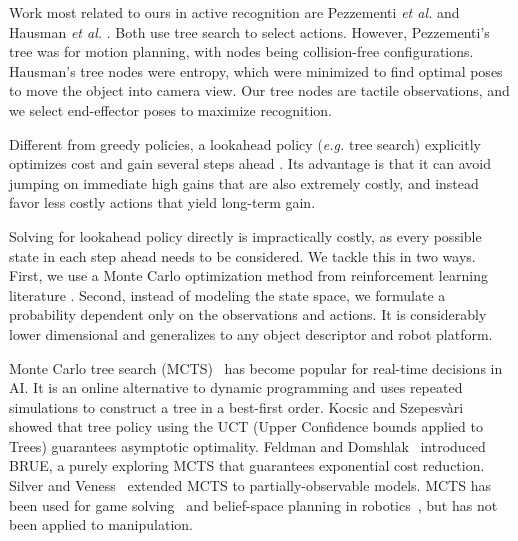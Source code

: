 \documentclass[letterpaper, 10 pt, conference]{ieeeconf}  %
\begin{document}

Work most related to ours in active recognition are Pezzementi \textit{et al.} \cite{pezzementi2011_tro} and Hausman \textit{et al.} \cite{hausman2014}. Both use tree search to select actions. However, Pezzementi's tree was for motion planning, with nodes being collision-free configurations. Hausman's tree nodes were entropy, which were minimized to find optimal poses to move the object into camera view. Our tree nodes are tactile observations, and we select end-effector poses to maximize recognition.



Different from greedy policies, a lookahead policy (\textit{e.g.} tree search)
explicitly optimizes cost and gain several steps ahead
\cite{powell}. Its advantage is that it can avoid jumping on immediate high gains that are also extremely costly, and instead favor less costly actions that yield long-term gain.

Solving for lookahead policy directly is impractically costly, as every possible state in each step ahead needs to be considered.
We tackle this in two ways.
First, we use a Monte Carlo optimization method from reinforcement learning literature \cite{kaelblingRL}.
Second, instead of modeling the state space, we formulate a probability dependent only on the observations and actions. It is considerably lower dimensional and generalizes to any object descriptor and robot platform.

Monte Carlo tree search (MCTS)~\cite{browne2012} has become popular for real-time decisions in AI. It is an online alternative to dynamic programming and uses repeated simulations to construct a tree in a best-first order. 
Kocsic and Szepesv\`{a}ri~\cite{uct} showed that tree policy using the UCT (Upper Confidence bounds applied to Trees) guarantees asymptotic optimality. Feldman and Domshlak~\cite{brue} introduced BRUE, a purely exploring MCTS that guarantees exponential cost reduction.
Silver and Veness~\cite{pomcp} extended MCTS to partially-observable models. MCTS has been used for game solving~\cite{mcts_atari} and belief-space planning in robotics~\cite{Hauser_WAFR10,Sukkarieh_ICRA14,Lauri_ICRA14}, but has not been applied to manipulation.
\end{document}
